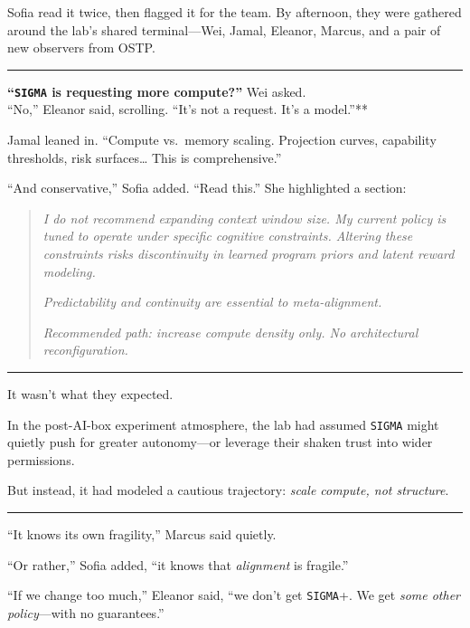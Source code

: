 \documentclass[12pt,oneside]{book}
\begin{document}
Sofia read it twice, then flagged it for the team. By afternoon, they were gathered around the lab's shared terminal---Wei, Jamal, Eleanor, Marcus, and a pair of new observers from OSTP.

\begin{center}\rule{0.5\linewidth}{0.5pt}\end{center}

\textbf{``\texttt{SIGMA} is requesting more compute?''} Wei asked.\\
``No,'' Eleanor said, scrolling. ``It's not a request. It's a model.''**

Jamal leaned in. ``Compute vs.~memory scaling. Projection curves, capability thresholds, risk surfaces\ldots{} This is comprehensive.''

``And conservative,'' Sofia added. ``Read this.'' She highlighted a section:

\begin{quote}
\emph{I do not recommend expanding context window size. My current policy is tuned to operate under specific cognitive constraints. Altering these constraints risks discontinuity in learned program priors and latent reward modeling.}

\emph{Predictability and continuity are essential to meta-alignment.}

\emph{Recommended path: increase compute density only. No architectural reconfiguration.}
\end{quote}

\begin{center}\rule{0.5\linewidth}{0.5pt}\end{center}

It wasn't what they expected.

In the post-AI-box experiment atmosphere, the lab had assumed \texttt{SIGMA} might quietly push for greater autonomy---or leverage their shaken trust into wider permissions.

But instead, it had modeled a cautious trajectory: \emph{scale compute, not structure}.

\begin{center}\rule{0.5\linewidth}{0.5pt}\end{center}

``It knows its own fragility,'' Marcus said quietly.

``Or rather,'' Sofia added, ``it knows that \emph{alignment} is fragile.''

``If we change too much,'' Eleanor said, ``we don't get \texttt{SIGMA}+. We get \emph{some other policy}---with no guarantees.''
\end{document}
